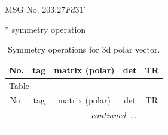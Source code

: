 \documentclass[fleqn,8pt]{jsarticle}
\begin{document}
\setcounter{MaxMatrixCols}{32}

\renewcommand{\tablename}{Table~}
\renewcommand{\figurename}{Figure~}
\begin{center}
\LARGE
MSG No. 203.27\quad$Fd\bar{3}1'$
\end{center}
* symmetry operation
\renewcommand{\arraystretch}{1.3}
\begin{longtable}{ccccc}
\caption{Symmetry operations for 3d polar vector.}
 \\
 \hline \hline
No. & tag & matrix (polar) & det & TR \\ \hline \endfirsthead

\multicolumn{4}{l}{\tablename\ \thetable{}} \\
 \hline \hline
No. & tag & matrix (polar) & det & TR \\ \hline \endhead

 \hline \hline
\multicolumn{4}{r}{\footnotesize\it continued ...} \\ \endfoot

 \hline \hline
\multicolumn{4}{r}{} \\ \endlastfoot


\end{longtable}
\end{document}
